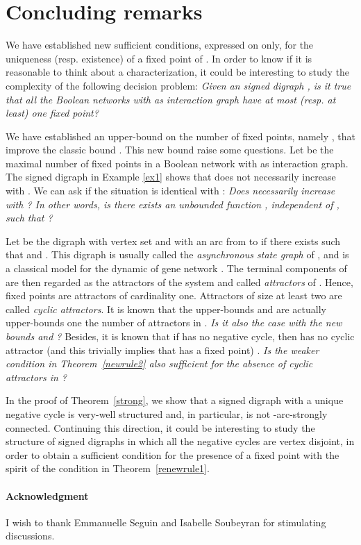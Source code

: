 \documentclass[11pt,a4paper]{article}
\begin{document}
\section{Concluding remarks}\label{sec:conclusion}


We have established new sufficient conditions, expressed on  only, for the uniqueness (resp. existence) of a fixed point of . In order to know if it is reasonable to think about a characterization, it could be interesting to study the complexity of the following decision problem: {\em Given an signed digraph , is it true that all the Boolean networks with  as interaction graph have at most (resp. at least) one fixed point?}

\medskip
We have established an upper-bound on the number of fixed points, namely , that improve the classic bound . This new bound raise some questions. Let  be the maximal number of fixed points in a Boolean network with  as interaction graph. The signed digraph in Example \ref{ex1} shows that  does not necessarily increase with . We can ask if the situation is identical with : {\em Does  necessarily increase with ? In other words, is there exists an unbounded function , independent of , such that ?} 

\medskip
Let  be the digraph with vertex set  and with an arc from  to  if there exists  such that  and . This digraph  is usually called the {\em asynchronous state graph} of , and is a classical model for the dynamic of gene network \cite{TA90,TK01}. The terminal components of  are then regarded as the attractors of the system and called {\em attractors} of . Hence, fixed points are attractors of cardinality one. Attractors of size at least two are called {\em cyclic attractors}. It is known that the upper-bounds  and  are actually upper-bounds one the number of attractors in  \cite{R09}. {\em Is it also the case with the new bounds  and ?} Besides, it is known that if  has no negative cycle, then  has no cyclic attractor (and this trivially implies that  has a fixed point) \cite{R10}. {\em Is the weaker condition in Theorem~\ref{newrule2} also sufficient for the absence of cyclic attractors in ?} 


\medskip
In the proof of Theorem~\ref{strong}, we show that a signed digraph with a unique negative cycle is very-well structured and, in particular, is not -arc-strongly connected. Continuing this direction, it could be interesting to study the structure of signed digraphs in which all the negative cycles are vertex disjoint, in order to obtain a sufficient condition for the presence of a fixed point with the spirit of the condition in Theorem~\ref{renewrule1}. 

\paragraph{Acknowledgment} I wish to thank Emmanuelle Seguin and Isabelle Soubeyran for stimulating discussions. 



\end{document}
